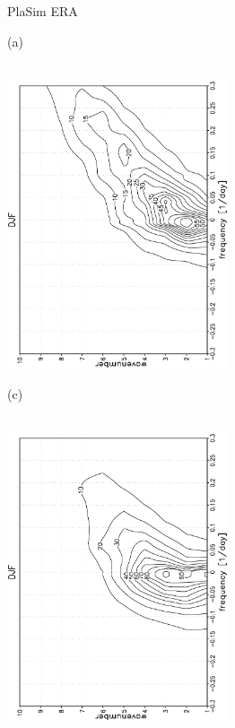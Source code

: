 \documentclass[12pt,a4paper,twoside,openright,headinclude,liststotoc,bibtotoc]{scrreprt}
\begin{document}
\begin{figure}[b]
\hspace{3.8cm}PlaSim \vspace{0.1cm} \hspace{7.3cm} ERA \\
\parbox{8.5cm}{\hspace{0.50cm}\begin{scriptsize}(a)\end{scriptsize} \vspace{-0.5cm} \\
\includegraphics[height=8.5cm,width=6.5cm,angle=-90]
{eps/wave.srv_powerDJF.eps}
}
\parbox{8.5cm}{\hspace{0.52cm}\begin{scriptsize}(c)\end{scriptsize} \vspace{-0.5cm} \\
\includegraphics[height=8.5cm,width=6.5cm,angle=-90]
{eps/DJFERA_Z500_power.eps}
}
\end{figure}
\end{document}
